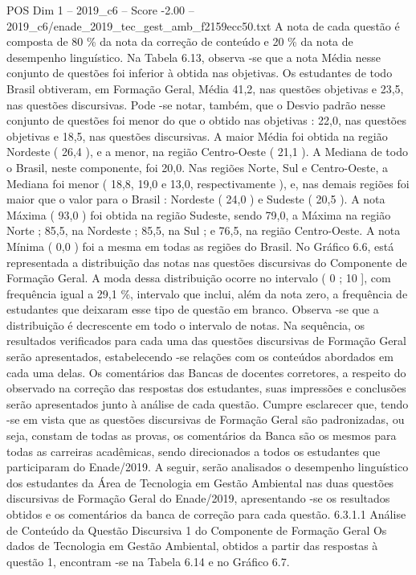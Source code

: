 \begin{textsample}{POS Dim 1 – 2019\_c6 – Score -2.00 – 2019\_c6/enade\_2019\_tec\_gest\_amb\_f2159ecc50.txt}
A nota de cada questão é composta de 80 \% da nota da correção de conteúdo e 20 \% da nota de desempenho linguístico.
Na Tabela 6.13, observa -se que a nota Média nesse conjunto de questões foi inferior à obtida nas objetivas.
Os estudantes de todo Brasil obtiveram, em Formação Geral, Média 41,2, nas questões objetivas e 23,5, nas questões discursivas.
Pode -se notar, também, que o Desvio padrão nesse conjunto de questões foi menor do que o obtido nas objetivas : 22,0, nas questões objetivas e 18,5, nas questões discursivas.
A maior Média foi obtida na região Nordeste ( 26,4 ), e a menor, na região Centro-Oeste ( 21,1 ).
A Mediana de todo o Brasil, neste componente, foi 20,0.
Nas regiões Norte, Sul e Centro-Oeste, a Mediana foi menor ( 18,8, 19,0 e 13,0, respectivamente ), e, nas demais regiões foi maior que o valor para o Brasil : Nordeste ( 24,0 ) e Sudeste ( 20,5 ).
A nota Máxima ( 93,0 ) foi obtida na região Sudeste, sendo 79,0, a Máxima na região Norte ; 85,5, na Nordeste ; 85,5, na Sul ; e 76,5, na região Centro-Oeste.
A nota Mínima ( 0,0 ) foi a mesma em todas as regiões do Brasil.
No Gráfico 6.6, está representada a distribuição das notas nas questões discursivas do Componente de Formação Geral.
A moda dessa distribuição ocorre no intervalo ( 0 ; 10 ], com frequência igual a 29,1 \%, intervalo que inclui, além da nota zero, a frequência de estudantes que deixaram esse tipo de questão em branco.
Observa -se que a distribuição é decrescente em todo o intervalo de notas.
Na sequência, os resultados verificados para cada uma das questões discursivas de Formação Geral serão apresentados, estabelecendo -se relações com os conteúdos abordados em cada uma delas.
Os comentários das Bancas de docentes corretores, a respeito do observado na correção das respostas dos estudantes, suas impressões e conclusões serão apresentados junto à análise de cada questão.
Cumpre esclarecer que, tendo -se em vista que as questões discursivas de Formação Geral são padronizadas, ou seja, constam de todas as provas, os comentários da Banca são os mesmos para todas as carreiras acadêmicas, sendo direcionados a todos os estudantes que participaram do Enade/2019.
A seguir, serão analisados o desempenho linguístico dos estudantes da Área de Tecnologia em Gestão Ambiental nas duas questões discursivas de Formação Geral do Enade/2019, apresentando -se os resultados obtidos e os comentários da banca de correção para cada questão. 6.3.1.1 Análise de Conteúdo da Questão Discursiva 1 do Componente de Formação Geral Os dados de Tecnologia em Gestão Ambiental, obtidos a partir das respostas à questão 1, encontram -se na Tabela 6.14 e no Gráfico 6.7.

\end{textsample}
